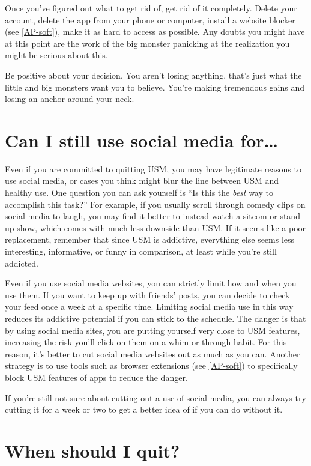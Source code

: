 \documentclass[
  openany]{book}
\begin{document}
Once you've figured out what to get rid of, get rid of it completely. Delete your account, delete the app from your phone or computer, install a website blocker (see \ref{AP-soft}), make it as hard to access as possible. Any doubts you might have at this point are the work of the big monster panicking at the realization you might be serious about this.

Be positive about your decision. You aren't losing anything, that's just what the little and big monsters want you to believe. You're making tremendous gains and losing an anchor around your neck.

\section{Can I still use social media for\ldots{}}\label{can-i-still-use-social-media-for}

Even if you are committed to quitting USM, you may have legitimate reasons to use social media, or cases you think might blur the line between USM and healthy use. One question you can ask yourself is ``Is this the \emph{best} way to accomplish this task?'' For example, if you usually scroll through comedy clips on social media to laugh, you may find it better to instead watch a sitcom or stand-up show, which comes with much less downside than USM. If it seems like a poor replacement, remember that since USM is addictive, everything else seems less interesting, informative, or funny in comparison, at least while you're still addicted.

Even if you use social media websites, you can strictly limit how and when you use them. If you want to keep up with friends' posts, you can decide to check your feed once a week at a specific time. Limiting social media use in this way reduces its addictive potential if you can stick to the schedule. The danger is that by using social media sites, you are putting yourself very close to USM features, increasing the risk you'll click on them on a whim or through habit. For this reason, it's better to cut social media websites out as much as you can. Another strategy is to use tools such as browser extensions (see \ref{AP-soft}) to specifically block USM features of apps to reduce the danger.

If you're still not sure about cutting out a use of social media, you can always try cutting it for a week or two to get a better idea of if you can do without it.

\section{When should I quit?}\label{when-should-i-quit}
\end{document}

